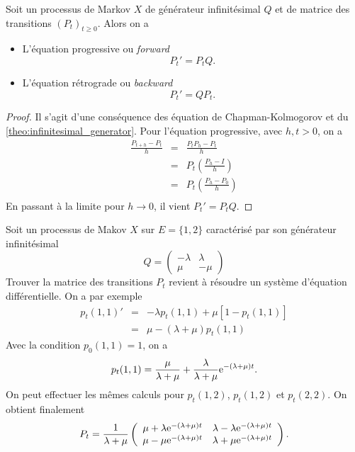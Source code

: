 \begin{prop}
Soit un processus de Markov $X$ de générateur infinitésimal $Q$ et de matrice des transitions $(P_t)_{t\geq0}$. Alors on a 
\begin{itemize}
	\item L'équation progressive ou \textit{forward}
	$$
	P_t' = P_t Q.
	$$
	\item L'équation rétrograde ou \textit{backward}
	$$
	P_t' = Q P_t.
	$$
\end{itemize}
\end{prop}
\begin{proof}
Il s'agit d'une conséquence des équation de Chapman-Kolmogorov et du \cref{theo:infinitesimal_generator}. Pour l'équation progressive, avec $h,t>0$, on a 
\begin{eqnarray*}
\frac{P_{t+h} - P_t}{h}&=&\frac{P_{t}P_{h} - P_t}{h}\\
&=&P_t\left(\frac{P_{h} - I}{h}\right)\\
&=&P_t\left(\frac{P_{h} - P_0}{h}\right)\\
\end{eqnarray*}
En passant à la limite pour $h\rightarrow 0$, il vient $P_t' = P_tQ$.
\end{proof}
\begin{ex}\label{ex:two_state_cont_markov_chain}
Soit un processus de Makov $X$ sur $E=\{1, 2\}$ caractérisé par son générateur infinitésimal 
$$
Q = \left(\begin{array}{cc}
-\lambda & \lambda\\
\mu & -\mu
\end{array}\right)
$$
Trouver la matrice des transitions $P_t$ revient à résoudre un système d'équation différentielle. On a par exemple
\begin{eqnarray*}
p_t(1,1)' &=& -\lambda p_t(1,1)+ \mu[1- p_t(1,1)]\\
&=& \mu - (\lambda + \mu)p_t(1,1)
\end{eqnarray*}
Avec la condition $p_0(1,1) = 1$, on a 
$$
p_t(1,1) = \frac{\mu}{\lambda + \mu} + \frac{\lambda}{\lambda + \mu}\mathrm{e}^{-(\lambda + \mu)t}.
$$
On peut effectuer les mêmes calculs pour $p_t(1,2)$, $p_t(1,2)$ et $p_t(2,2)$. On obtient finalement
$$
P_t = \frac{1}{\lambda + \mu}
\left(\begin{array}{cc}
\mu +\lambda \mathrm{e}^{-(\lambda +\mu)t}&\lambda -\lambda \mathrm{e}^{-(\lambda +\mu)t}\\
\mu -\mu \mathrm{e}^{-(\lambda +\mu)t}&\lambda +\mu \mathrm{e}^{-(\lambda +\mu)t}\\
\end{array}\right).
$$
\end{ex}

